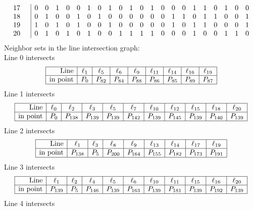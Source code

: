 \documentclass{article}
\begin{document}
{{$$\begin{array}{rr|*{21}r}
17 &  & 0 & 0 & 1 & 0 & 0 & 1 & 0 & 1 & 0 & 1 & 0 & 1 & 0 & 0 & 0 & 1 & 1 & 0 & 1 & 0 & 0\\
18 &  & 0 & 1 & 0 & 0 & 1 & 0 & 1 & 0 & 0 & 0 & 0 & 0 & 0 & 1 & 1 & 0 & 1 & 1 & 0 & 0 & 1\\
19 &  & 1 & 0 & 1 & 0 & 1 & 0 & 0 & 1 & 0 & 0 & 0 & 0 & 0 & 1 & 0 & 1 & 1 & 0 & 0 & 0 & 1\\
20 &  & 0 & 1 & 0 & 1 & 0 & 1 & 0 & 0 & 1 & 1 & 1 & 1 & 0 & 0 & 0 & 1 & 0 & 0 & 1 & 1 & 0\\
\end{array}
$$
}%
Neighbor sets in the line intersection graph:\\
Line 0 intersects 
$$
\begin{array}{|r*{8}{|c}|}
\hline
\mbox{Line}  & \ell_{1} & \ell_{5} & \ell_{6} & \ell_{9} & \ell_{11} & \ell_{14} & \ell_{16} & \ell_{19}\\
\hline
\mbox{in point}  & P_{0} & P_{82} & P_{84} & P_{88} & P_{86} & P_{85} & P_{89} & P_{87}\\
\hline
\end{array}
$$
Line 1 intersects 
$$
\begin{array}{|r*{10}{|c}|}
\hline
\mbox{Line}  & \ell_{0} & \ell_{2} & \ell_{3} & \ell_{5} & \ell_{7} & \ell_{10} & \ell_{12} & \ell_{15} & \ell_{18} & \ell_{20}\\
\hline
\mbox{in point}  & P_{0} & P_{138} & P_{139} & P_{139} & P_{142} & P_{139} & P_{145} & P_{139} & P_{140} & P_{139}\\
\hline
\end{array}
$$
Line 2 intersects 
$$
\begin{array}{|r*{8}{|c}|}
\hline
\mbox{Line}  & \ell_{1} & \ell_{3} & \ell_{8} & \ell_{9} & \ell_{13} & \ell_{14} & \ell_{17} & \ell_{19}\\
\hline
\mbox{in point}  & P_{138} & P_{5} & P_{200} & P_{164} & P_{155} & P_{182} & P_{173} & P_{191}\\
\hline
\end{array}
$$
Line 3 intersects 
$$
\begin{array}{|r*{10}{|c}|}
\hline
\mbox{Line}  & \ell_{1} & \ell_{2} & \ell_{4} & \ell_{5} & \ell_{6} & \ell_{10} & \ell_{11} & \ell_{15} & \ell_{16} & \ell_{20}\\
\hline
\mbox{in point}  & P_{139} & P_{5} & P_{146} & P_{139} & P_{163} & P_{139} & P_{181} & P_{139} & P_{192} & P_{139}\\
\hline
\end{array}
$$
Line 4 intersects 
$$
\begin{array}{|r*{8}{|c}|}

\end{array}$$}
\end{document}

